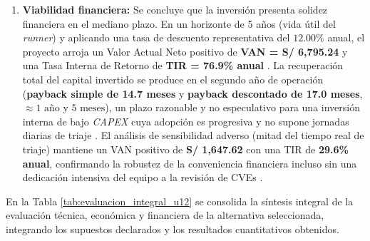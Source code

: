\begin{enumerate}[leftmargin=1.27cm, label=\alph*)]
    \item \textbf{Viabilidad financiera:} Se concluye que la inversión presenta solidez financiera en el mediano plazo. En un horizonte de 5 años (vida útil del \textit{runner}) y aplicando una tasa de descuento representativa del $12.00\%$ anual, el proyecto arroja un Valor Actual Neto positivo de \textbf{VAN = S/ 6,795.24} y una Tasa Interna de Retorno de \textbf{TIR = 76.9\% anual} \parencite{torres2026proyecto}. %
    La recuperación total del capital invertido se produce en el segundo año de operación (\textbf{payback simple de 14.7 meses} y \textbf{payback descontado de 17.0 meses}, $\approx 1\text{ año y } 5\text{ meses}$), un plazo razonable y no especulativo para una inversión interna de bajo \textit{CAPEX} cuya adopción es progresiva y no supone jornadas diarias de triaje \parencite{torres2026proyecto}. %
    El análisis de sensibilidad adverso (mitad del tiempo real de triaje) mantiene un VAN positivo de \textbf{S/ 1,647.62} con una TIR de \textbf{29.6\% anual}, confirmando la robustez de la conveniencia financiera incluso sin una dedicación intensiva del equipo a la revisión de CVEs \parencite{torres2026proyecto}. %
\end{enumerate}

En la Tabla \ref{tab:evaluacion_integral_u12} se consolida la síntesis integral de la evaluación técnica, económica y financiera de la alternativa seleccionada, integrando los supuestos declarados y los resultados cuantitativos obtenidos.

